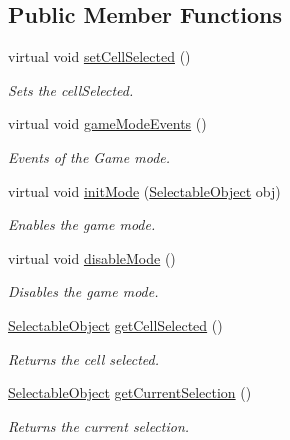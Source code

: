 \subsection*{Public Member Functions}
\begin{DoxyCompactItemize}
\item 
virtual void \mbox{\hyperlink{class_game_mode_af0110e3ce61ccc4d2f77d64ffb9eeecf}{set\+Cell\+Selected}} ()
\begin{DoxyCompactList}\small\item\em Sets the cell\+Selected. \end{DoxyCompactList}\item 
virtual void \mbox{\hyperlink{class_game_mode_a32a61bf0dfef83cfc1724b92f3d50cdf}{game\+Mode\+Events}} ()
\begin{DoxyCompactList}\small\item\em Events of the Game mode. \end{DoxyCompactList}\item 
virtual void \mbox{\hyperlink{class_game_mode_ac6701d024e8ab5bf8a8876618a6fd01f}{init\+Mode}} (\mbox{\hyperlink{class_selectable_object}{Selectable\+Object}} obj)
\begin{DoxyCompactList}\small\item\em Enables the game mode. \end{DoxyCompactList}\item 
virtual void \mbox{\hyperlink{class_game_mode_a5aea49bdae2459b78e1972dd0a34918e}{disable\+Mode}} ()
\begin{DoxyCompactList}\small\item\em Disables the game mode. \end{DoxyCompactList}\item 
\mbox{\hyperlink{class_selectable_object}{Selectable\+Object}} \mbox{\hyperlink{class_game_mode_a4403dc7308e53384ec79bb67125f7324}{get\+Cell\+Selected}} ()
\begin{DoxyCompactList}\small\item\em Returns the cell selected. \end{DoxyCompactList}\item 
\mbox{\hyperlink{class_selectable_object}{Selectable\+Object}} \mbox{\hyperlink{class_game_mode_ab4b23a7abb615a7ae22212a140997f11}{get\+Current\+Selection}} ()
\begin{DoxyCompactList}\small\item\em Returns the current selection. \end{DoxyCompactList}\item 

\end{DoxyCompactItemize}
